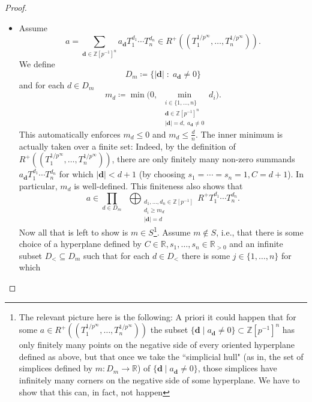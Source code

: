 \documentclass[10pt,a4paper]{amsart}
\newcommand{\RR}{\mathbb{R}}
\newcommand{\ZZip}{\ZZ[p^{-1}]}
\newcommand{\ZZ}{\mathbb{Z}}
\newcommand{\pRoots}{{1/p^\infty}}
\begin{document}
\begin{proof}
\begin{itemize}
\[        R^+ T_1^{d_1}\cdots T_n^{d_n}\]
        for some \(m\in S\). Let \(H\) be an oriented hyperplane defined by \(s_1,\dots,s_n,C\). Then by the discussion about \(S\) above only finitely many \(d\in D_m\) define shifted simplices having at least one point lying on the negative side of \(H\), and any such \((d,m_d)\) can contribute only finitely many summands, so in total, \(a\) has only finitely many non-zero summands \(a_{\mathbf{d}}^{}T_1^{d_1}\cdots T_n^{d_n}\) such that \(\mathbf{d}\) lies on the negative side of \(H\). Thus \(a\in R^+((T_1^{\pRoots},\dots,T_n^{\pRoots}))\).
        \item["\(\subseteq\)":] Assume 
        \[a=\sum_{\mathbf{d}\in \ZZip^n} a_{\mathbf{d}}^{}T_1^{d_1}\cdots T_n^{d_n}\in R^+((T_1^{\pRoots},\dots,T_n^{\pRoots})).\]
        We define 
        \[D_m\coloneqq\{|\mathbf d|\;:\; a_{\mathbf d}\neq 0\}\]
        and for each \(d\in D_m\)
        \[m_d\coloneqq \min\Big(0,\;
        \min_{\substack{i\in\{1,\dots,n\}\\\mathbf d\in \ZZip^n\\|\mathbf d|=d,\;a_{\mathbf d}\neq 0}} d_i\Big).\]
        This automatically enforces \(m_d\leq 0\) and \(m_d\leq \frac dn\). The inner minimum is actually taken over a finite set: Indeed, by the definition of \(R^+((T_1^{\pRoots},\dots, T_n^{\pRoots}))\), there are only finitely many non-zero summands \(a_{\mathbf d}T_1^{d_1}\cdots T_n^{d_n}\) for which \(|\mathbf d|<d+1\) (by choosing \(s_1=\cdots=s_n=1, C= d+1\)). In particular, \(m_d\) is well-defined. This finiteness also shows that
        \[a\in\prod_{d\in D_m}
        \;\;\bigoplus_{\substack{d_1,\dots,d_n\in \ZZ[p^{-1}]\\
        d_i\geq m_d\\
        |\mathbf d|=d}}
        R^+ T_1^{d_1}\cdots T_n^{d_n}.\]
        Now all that is left to show is \(m\in S\)\footnote{The relevant picture here is the following: A priori it could happen that for some \(a\in R^+((T_1^{\pRoots},\dots, T_n^{\pRoots}))\) the subset \(\{\mathbf d \mid a_{\mathbf d}\neq 0\}\subset \ZZip^n\) has only finitely many points on the negative side of every oriented hyperplane defined as above, but that once we take the ``simplicial hull" (as in, the set of simplices defined by \(m\colon D_m\to \RR\)) of \(\{\mathbf d \mid a_{\mathbf d}\neq 0\}\), those simplices have infinitely many corners on the negative side of some hyperplane. We have to show that this can, in fact, not happen}. Assume \(m\notin S\), i.e., that there is some choice of a hyperplane defined by \(C\in \RR,s_1,\dots,s_n\in \RR_{>0}\) and an infinite subset \(D_<\subseteq D_m\) such that for each \(d\in D_<\) there is some \(j\in \{1,\dots,n\}\) for which

\end{itemize}
\end{proof}
\end{document}
